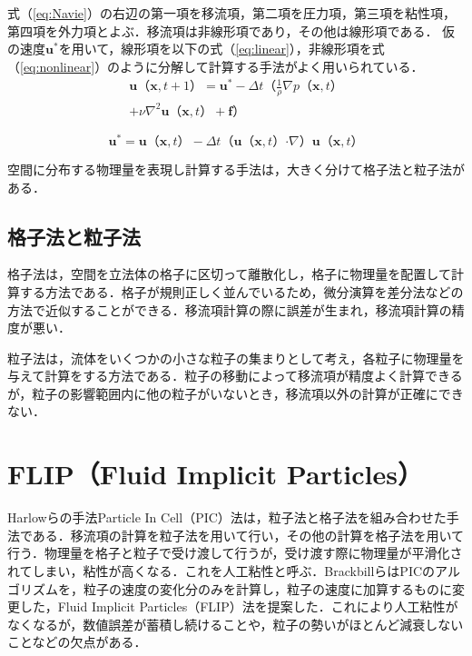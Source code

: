 \documentclass[10pt,a4paper,notitlepage,oneside,twocolumn]{abst_jsarticle}
\begin{document}
式（\ref{eq:Navie}）の右辺の第一項を移流項，第二項を圧力項，第三項を粘性項，第四項を外力項とよぶ．移流項は非線形項であり，その他は線形項である．
仮の速度$\bm{u}^*$を用いて，線形項を以下の式（\ref{eq:linear}），非線形項を式（\ref{eq:nonlinear}）のように分解して計算する手法がよく用いられている．
\begin{equation}\label{eq:linear}
\begin{split}
\bm{u}（\bm{x},t+1） =  \bm{u}^* - \varDelta t（\frac{1}{\rho}\nabla p（\bm{x},t）\\ + \nu\nabla^2\bm{u}（\bm{x},t） + \bm{f}）
\end{split}
\end{equation} 

\begin{equation}\label{eq:nonlinear}
\bm{u}^* = \bm{u}（\bm{x},t） - \varDelta t（\bm{u}（\bm{x},t） \boldsymbol{\cdot}\nabla）\bm{u}（\bm{x},t） 
\end{equation}

空間に分布する物理量を表現し計算する手法は，大きく分けて格子法と粒子法がある．
\subsection{格子法と粒子法} \label{subsec:grid}
格子法は，空間を立法体の格子に区切って離散化し，格子に物理量を配置して計算する方法である．格子が規則正しく並んでいるため，微分演算を差分法などの方法で近似することができる．移流項計算の際に誤差が生まれ，移流項計算の精度が悪い．

粒子法は，流体をいくつかの小さな粒子の集まりとして考え，各粒子に物理量を与えて計算をする方法である．粒子の移動によって移流項が精度よく計算できるが，粒子の影響範囲内に他の粒子がいないとき，移流項以外の計算が正確にできない．

\section{FLIP（Fluid Implicit Particles）} \label{sec:FLIP}
Harlowらの手法Particle In Cell（PIC）法\cite{PIC}は，粒子法と格子法を組み合わせた手法である．移流項の計算を粒子法を用いて行い，その他の計算を格子法を用いて行う．物理量を格子と粒子で受け渡して行うが，受け渡す際に物理量が平滑化されてしまい，粘性が高くなる．これを人工粘性と呼ぶ．BrackbillらはPICのアルゴリズムを，粒子の速度の変化分のみを計算し，粒子の速度に加算するものに変更した，Fluid Implicit Particles（FLIP）法\cite{FLIP}を提案した．これにより人工粘性がなくなるが，数値誤差が蓄積し続けることや，粒子の勢いがほとんど減衰しないことなどの欠点がある．
\end{document}
